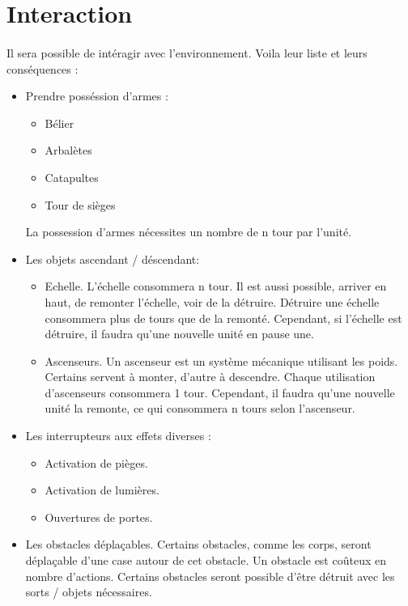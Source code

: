 \newpage
\section{Interaction}
\paragraph{} Il sera possible de intéragir avec l'environnement. Voila leur liste et leurs conséquences :

\begin{itemize}
	\item Prendre posséssion d'armes :
		\begin{itemize}
			\item Bélier
			\item Arbalètes
			\item Catapultes
			\item Tour de sièges
		\end{itemize}
	La possession d'armes nécessites un nombre de n tour par l'unité.
	\item Les objets ascendant / déscendant:
		\begin{itemize}
			\item Echelle. L'échelle consommera n tour. Il est aussi possible, arriver en haut, de remonter l'échelle, voir de la détruire. Détruire une échelle consommera plus de tours que de la remonté. Cependant, si l'échelle est détruire, il faudra qu'une nouvelle unité en pause une.
			\item Ascenseurs. Un ascenseur est un système mécanique utilisant les poids. Certains servent à monter, d'autre à descendre. Chaque utilisation d'ascenseurs consommera 1 tour. Cependant, il faudra qu'une nouvelle unité la remonte, ce qui consommera n tours selon l'ascenseur.
		\end{itemize}

	\item Les interrupteurs aux effets diverses :
		\begin{itemize}
			\item Activation de pièges.
			\item Activation de lumières.
			\item Ouvertures de portes.
		\end{itemize}

	\item Les obstacles déplaçables. Certains obstacles, comme les corps, seront déplaçable d'une case autour de cet obstacle. Un obstacle est coûteux en nombre d'actions.
	Certains obstacles seront possible d'être détruit avec les sorts / objets nécessaires.
\end{itemize}
